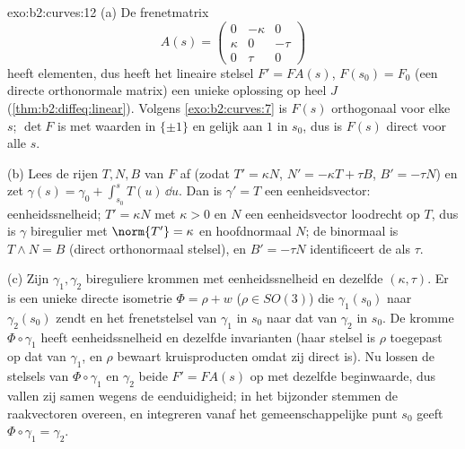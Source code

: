 \begin{solution}{exo:b2:curves:12}
(a) De frenetmatrix
\[
A(s) = \begin{pmatrix} 0 & -\kappa & 0\\ \kappa & 0 & -\tau\\
0 & \tau & 0\end{pmatrix}
\]
heeft  elementen, dus heeft het lineaire stelsel $F' =
FA(s)$, $F(s_0) = F_0$ (een directe orthonormale matrix) een unieke
oplossing op heel $J$ (\cref{thm:b2:diffeq:linear}). Volgens
\cref{exo:b2:curves:7} is $F(s)$ orthogonaal voor elke $s$; $\det
F$ is  met waarden in $\{\pm1\}$ en gelijk aan $1$ in $s_0$,
dus is $F(s)$ direct voor alle $s$.

(b) Lees de rijen $T, N, B$ van $F$ af (zodat $T' = \kappa N$, $N'
= -\kappa T + \tau B$, $B' = -\tau N$) en zet $\gamma(s) = \gamma_0
+ \int_{s_0}^s T(u)\,\dd u$. Dan is $\gamma' = T$ een
eenheidsvector: eenheidssnelheid; $T' = \kappa N$ met $\kappa > 0$
en $N$ een eenheidsvector loodrecht op $T$, dus is $\gamma$
biregulier met  $\norm{T'} = \kappa$ en hoofdnormaal $N$;
de binormaal is $T \wedge N = B$ (direct orthonormaal stelsel), en
$B' = -\tau N$ identificeert de  als $\tau$.

(c) Zijn $\gamma_1, \gamma_2$ bireguliere krommen met
eenheidssnelheid en dezelfde $(\kappa, \tau)$. Er is een unieke
directe isometrie $\Phi = \rho + w$ ($\rho \in SO(3)$) die
$\gamma_1(s_0)$ naar $\gamma_2(s_0)$ zendt en het frenetstelsel van
$\gamma_1$ in $s_0$ naar dat van $\gamma_2$ in $s_0$. De kromme
$\Phi\circ\gamma_1$ heeft eenheidssnelheid en dezelfde invarianten
(haar stelsel is $\rho$ toegepast op dat van $\gamma_1$, en $\rho$
bewaart kruisproducten omdat zij direct is). Nu lossen de stelsels
van $\Phi\circ\gamma_1$ en $\gamma_2$ beide $F' = FA(s)$ op met
dezelfde beginwaarde, dus vallen zij samen wegens de
eenduidigheid; in het bijzonder stemmen de raakvectoren overeen, en
integreren vanaf het gemeenschappelijke punt $s_0$ geeft
$\Phi\circ\gamma_1 = \gamma_2$.
\end{solution}

